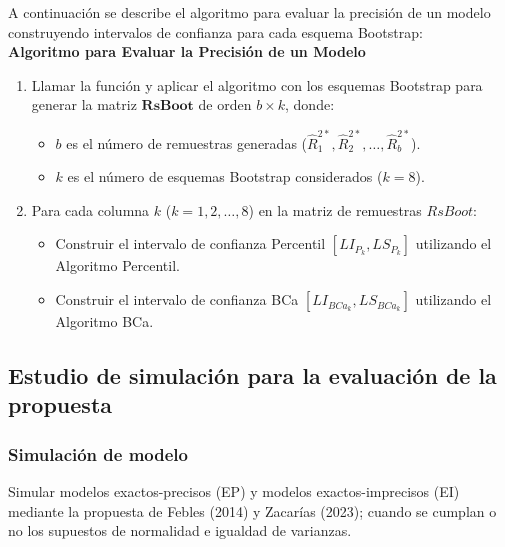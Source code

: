 A continuación se describe el algoritmo para evaluar la precisión de un modelo construyendo intervalos de confianza para cada esquema Bootstrap:\\


\textbf{Algoritmo para Evaluar la Precisión de un Modelo}

\begin{enumerate}
	
	\item Llamar la función y aplicar el algoritmo con los esquemas Bootstrap para generar la matriz \( \mathbf{RsBoot} \) de orden \( b \times k \), donde:
	\begin{itemize}
		\item \( b \) es el número de remuestras generadas (\( \hat{R}^{2*}_{1}, \hat{R}^{2*}_{2}, \dots, \hat{R}^{2*}_{b} \)).
		\item \( k \) es el número de esquemas Bootstrap considerados (\( k = 8 \)).
	\end{itemize}
	
	\item Para cada columna \( k \) (\( k = 1, 2, \dots, 8 \)) en la matriz de remuestras \( RsBoot \):
	\begin{itemize}
		\item Construir el intervalo de confianza Percentil \( [LI_{P_k}, LS_{P_k}] \) utilizando el Algoritmo Percentil.
		\item Construir el intervalo de confianza BCa \( [LI_{BCa_k}, LS_{BCa_k}] \) utilizando el Algoritmo BCa.
	\end{itemize}
\end{enumerate}




















	 
	 
\subsection{Estudio de simulación para la evaluación de la propuesta}
\vspace{1.5cm}

\subsubsection{Simulación de modelo}
Simular modelos exactos-precisos (EP) y modelos exactos-imprecisos (EI) mediante la propuesta de Febles (2014) y Zacarías (2023); cuando se cumplan o no los supuestos de normalidad e igualdad de varianzas.

